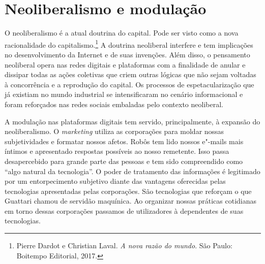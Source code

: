 \section{Neoliberalismo e modulação}

O neoliberalismo é a atual doutrina do capital. Pode ser visto como a
nova racionalidade do capitalismo.\footnote{Pierre Dardot e Christian Laval. \emph{A nova razão do mundo}. São Paulo: Boitempo Editorial, 2017.} A doutrina
neoliberal interfere e tem implicações no desenvolvimento da Internet e
de suas invenções. Além disso, o pensamento neoliberal opera nas redes
digitais e plataformas com a finalidade de anular e dissipar todas as
ações coletivas que criem outras lógicas que não sejam voltadas à
concorrência e a reprodução do capital. Os processos de
espetacularização que já existiam no mundo industrial se intensificaram
no cenário informacional e foram reforçados nas redes sociais embaladas
pelo contexto neoliberal.

A modulação nas plataformas digitais tem servido, principalmente, à
expansão do neoliberalismo. O \emph{marketing} utiliza as corporações para
moldar nossas subjetividades e formatar nossos afetos. Robôs tem lido
nossos e"-mails mais íntimos e apresentado respostas possíveis ao nosso
remetente. Isso passa desapercebido para grande parte das pessoas e tem
sido compreendido como ``algo natural da tecnologia''. O poder de
tratamento das informações é legitimado por um entorpecimento subjetivo
diante das vantagens oferecidas pelas tecnologias apresentadas pelas
corporações. São tecnologias que reforçam o que Guattari chamou de
servidão maquínica. Ao organizar nossas práticas cotidianas em torno
dessas corporações passamos de utilizadores à dependentes de suas
tecnologias.



